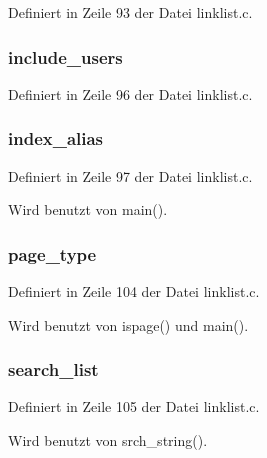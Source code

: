Definiert in Zeile 93 der Datei linklist.c.
\subsubsection{ {\bf include\_\-users}}\label{linklist_8h_4301d92f7f72fdda0af03033d967155b}




Definiert in Zeile 96 der Datei linklist.c.
\subsubsection{ {\bf index\_\-alias}}\label{linklist_8h_a35b4fc28f26c83f77336185f9aa7175}




Definiert in Zeile 97 der Datei linklist.c.

Wird benutzt von main().
\subsubsection{ {\bf page\_\-type}}\label{linklist_8h_556b3c90c27ba5b38626945734914353}




Definiert in Zeile 104 der Datei linklist.c.

Wird benutzt von ispage() und main().
\subsubsection{ {\bf search\_\-list}}\label{linklist_8h_d93c06cbf86de996601e602d07da3663}




Definiert in Zeile 105 der Datei linklist.c.

Wird benutzt von srch\_\-string().